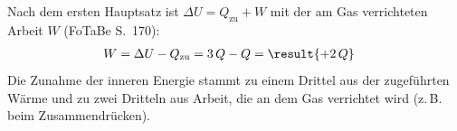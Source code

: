 Nach dem ersten Hauptsatz ist $\Delta U = Q_\text{zu} + W$ mit der am Gas verrichteten Arbeit $W$ (FoTaBe S.~170):
\begin{align}
 W &= \Delta U - Q_\text{zu} = 3\,Q - Q = \result{+2\,Q}
\end{align}
Die Zunahme der inneren Energie stammt zu einem Drittel aus der zugeführten Wärme und zu zwei Dritteln aus Arbeit, die an dem Gas verrichtet wird (z.\,B. beim Zusammendrücken).
